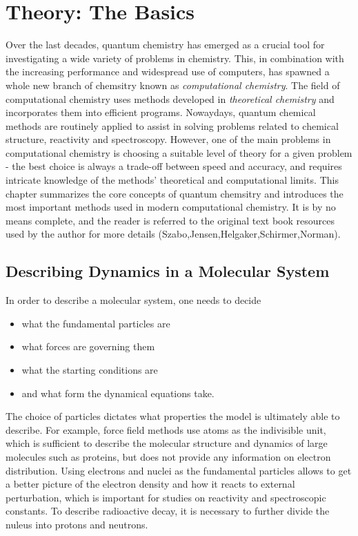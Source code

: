 \chapter{Theory: The Basics}

Over the last decades, quantum chemistry has emerged as a crucial tool for investigating a wide variety of problems in chemistry. This, in combination with the increasing performance and widespread use of computers, has spawned a whole new branch of chemsitry known as \emph{computational chemistry}. The field of computational chemistry uses methods developed in \emph{theoretical chemistry} and incorporates them into efficient programs. Nowaydays, quantum chemical methods are routinely applied to assist in solving problems related to chemical structure, reactivity and spectroscopy. However, one of the main problems in computational chemistry is choosing a suitable level of theory for a given problem - the best choice is always a trade-off between speed and accuracy, and requires intricate knowledge of the methods' theoretical and computational limits. This chapter summarizes the core concepts of quantum chemsitry and introduces the most important methods used in modern computational chemistry. It is by no means complete, and the reader is referred to the original text book resources used by the author for more details (Szabo,Jensen,Helgaker,Schirmer,Norman).

\section{Describing Dynamics in a Molecular System}

In order to describe a molecular system, one needs to decide
\begin{itemize}
\item what the fundamental particles are
\item what forces are governing them
\item what the starting conditions are
\item and what form the dynamical equations take.
\end{itemize}
\noindent The choice of particles dictates what properties the model is ultimately able to describe. For example, force field methods use atoms as the indivisible unit, which is sufficient to describe the molecular structure and dynamics of large molecules such as proteins, but does not provide any information on electron distribution. Using electrons and nuclei as the fundamental particles allows to get a better picture of the electron density and how it reacts to external perturbation, which is important for studies on reactivity and spectroscopic constants. To describe radioactive decay, it is necessary to further divide the nuleus into protons and neutrons. 

